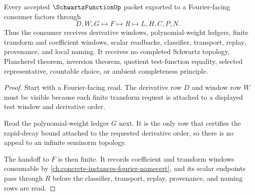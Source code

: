 \begin{theorem}
\label{thm:schwartz-function-fourier-stability}
Every accepted $\SchwartzFunctionUp$ packet exported to a Fourier-facing consumer factors through
$$
D,W,G\longmapsto F\longmapsto R\longmapsto L,H,C,P,N .
$$
Thus the consumer receives derivative windows, polynomial-weight ledgers, finite transform and coefficient windows, scalar readbacks, classifier, transport, replay, provenance, and local naming. It receives no completed Schwartz topology, Plancherel theorem, inversion theorem, quotient test-function equality, selected representative, countable choice, or ambient completeness principle.
\end{theorem}
\begin{proof}
Start with a Fourier-facing read. The derivative row $D$ and window row $W$ must be visible because each finite transform request is attached to a displayed test window and derivative order.

Read the polynomial-weight ledger $G$ next. It is the only row that certifies the rapid-decay bound attached to the requested derivative order, so there is no appeal to an infinite seminorm topology.

The handoff to $F$ is then finite. It records coefficient and transform windows consumable by \autoref{ch:concrete-instances-fourier-namecert}, and its scalar endpoints pass through $R$ before the classifier, transport, replay, provenance, and naming rows are read.
\end{proof}

